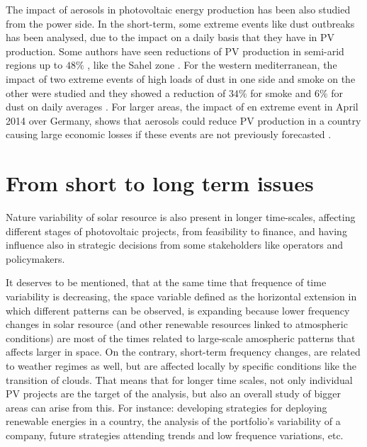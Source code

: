 The impact of aerosols in photovoltaic energy production has been also studied from the power side. In the short-term, some  extreme events like dust outbreaks has been analysed, due to the impact on a daily basis that they have in PV production. Some authors have seen reductions of PV production in semi-arid regions up to $48\%$ , like the Sahel zone \cite*{Neher2017}. For the western mediterranean, the impact of two extreme events of high loads of dust in one side and smoke on the other were studied and they showed a reduction of $34\%$ for smoke and $6\%$ for dust on daily averages \cite*{Gomez-Amo2019}. For larger areas, the impact of en extreme event in April 2014 over Germany, shows that aerosols could reduce PV production in a country causing large economic losses if these events are not previously forecasted \cite*{Rieger2017}.


\section{From short to long term issues}%

Nature variability of solar resource is also present in longer time-scales, affecting different stages of photovoltaic projects, from feasibility to finance, and having influence also in strategic decisions from some stakeholders like operators and policymakers.

It deserves to be mentioned, that at the same time that frequence of time variability is decreasing, the space variable defined as the horizontal extension in which different patterns can be observed, is expanding because lower frequency changes in solar resource (and other renewable resources linked to atmospheric conditions) are most of the times related to large-scale amospheric patterns that affects larger in space. On the contrary, short-term frequency changes, are related to weather regimes as well, but are affected locally by specific conditions like the transition of clouds. That means that for longer time scales, not only individual PV projects are the target of the analysis, but also an overall study of bigger areas can arise from this. For instance: developing strategies for deploying renewable energies in a country, the analysis of the portfolio's variability of a company, future strategies attending trends and low frequence variations, etc. 
 
